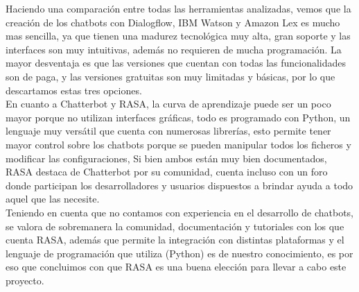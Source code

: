 \indent Haciendo una comparación entre todas las herramientas analizadas, vemos que la creación de
los chatbots con Dialogflow, IBM Watson y Amazon Lex es mucho mas sencilla, ya que tienen una
madurez tecnológica muy alta, gran soporte y las interfaces son muy intuitivas, además no requieren
de mucha programación. La mayor desventaja es que las versiones que cuentan con todas las
funcionalidades son de paga, y las versiones gratuitas son muy limitadas y básicas, por lo que
descartamos estas tres opciones.\\
\indent En cuanto a Chatterbot y RASA, la curva de aprendizaje puede ser un poco mayor porque no
utilizan interfaces gráficas, todo es programado con Python, un lenguaje muy versátil que cuenta
con numerosas librerías, esto permite tener mayor control sobre los chatbots porque se pueden
manipular todos los ficheros y modificar las configuraciones, Si bien ambos están muy bien
documentados, RASA destaca de Chatterbot por su comunidad, cuenta incluso con un foro donde
participan los desarrolladores y usuarios dispuestos a brindar ayuda a todo aquel que las
necesite.\\
\indent Teniendo en cuenta que no contamos con experiencia en el desarrollo de chatbots, se valora
de sobremanera la comunidad, documentación y tutoriales con los que cuenta RASA, además que permite
la integración con distintas plataformas y el lenguaje de programación que utiliza (Python) es de
nuestro conocimiento, es por eso que concluimos con que RASA es una buena elección para llevar a
cabo este proyecto.
